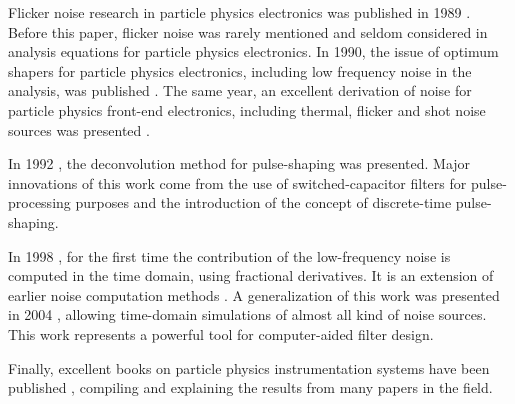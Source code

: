 Flicker noise research in particle physics electronics was published in 1989 \citep{lutz101}. Before this paper, flicker noise was rarely mentioned and seldom considered in analysis equations for particle physics electronics. In 1990, the issue of optimum shapers for particle physics electronics, including low frequency noise in the analysis, was published \citep{gatti104}. The same year, an excellent derivation of noise for particle physics front-end electronics, including thermal, flicker and shot noise sources was presented \citep{sansen101}.

In 1992 \citep{gadomski101}, the deconvolution method for pulse-shaping was presented. Major innovations of this work come from the use of switched-capacitor filters for \mbox{pulse-processing} purposes and the introduction of the concept of \mbox{discrete-time} \mbox{pulse-shaping}.

In 1998 \citep{pullia104}, for the first time the contribution of the low-frequency noise is computed in the time domain, using fractional derivatives. It is an extension of earlier noise computation methods \citep{goulding101}. A generalization of this work was presented in 2004 \citep{pullia102}, allowing time-domain simulations of almost all kind of noise sources.  This work represents a powerful tool for computer-aided filter design.



Finally, excellent books on particle physics instrumentation systems have been published \citep{radeka201}, compiling and explaining the results from many papers in the field.


